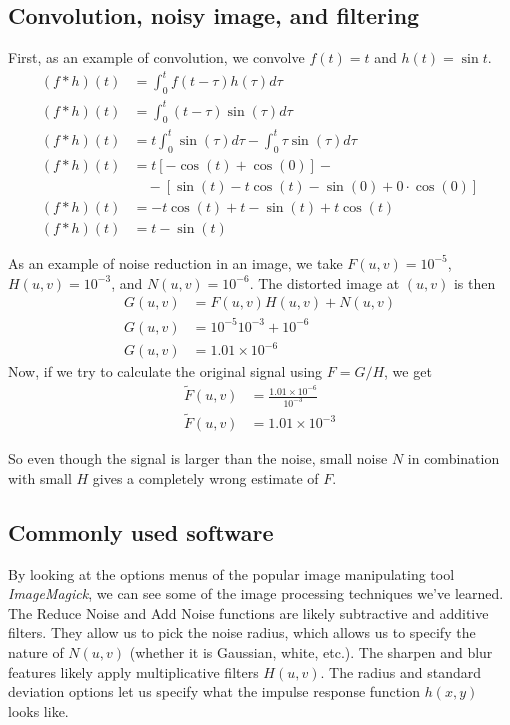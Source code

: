 \documentclass[twocolumn]{myarticle}
\begin{document}
\subsection{Convolution, noisy image, and filtering}
\label{subsec:convolution_noisy_image_and_filtering}

First, as an example of convolution, we convolve $ f(t) = t $ and $ h(t) = \sin t $.
\begin{align}
    (f * h)(t) &= \int_{0}^{t} f(t - \tau) h(\tau) d \tau
    \\
    (f * h)(t) &= \int_{0}^{t} (t - \tau) \sin(\tau) d \tau
    \\
    (f * h)(t) &= t \int_{0}^{t} \sin(\tau) d \tau - \int_{0}^{t} \tau \sin (\tau) d \tau
    \\
    (f * h)(t) &= t \left[ -\cos(t) + \cos(0) \right] - 
    \nonumber \\
    &\quad - \left[ \sin(t) - t \cos(t) - \sin(0) + 0 \cdot \cos(0) \right]
    \\
    (f * h)(t) &= - t \cos(t) + t - \sin(t) + t \cos(t)
    \\
    (f * h)(t) &= t - \sin(t)
\end{align}

As an example of noise reduction in an image, we take $ F(u,v) = 10^{-5} $, $ H(u,v) = 10^{-3} $, and $ N(u,v) = 10^{-6} $.
The distorted image at $ (u,v) $ is then
\begin{align}
    G(u,v) &= F(u,v) H(u,v) + N(u,v)
    \\
    G(u,v) &= 10^{-5} 10^{-3} + 10^{-6}
    \\
    G(u,v) &= 1.01 \times 10^{-6}
\end{align}
Now, if we try to calculate the original signal using $ F = G/H $, we get
\begin{align}
    \tilde{F}(u,v) &= \frac{1.01 \times 10^{-6}}{10^{-3}}
    \\
    \tilde{F}(u,v) &= 1.01 \times 10^{-3}
\end{align}

So even though the signal is larger than the noise, small noise $ N $ in combination with small $ H $ gives a completely wrong estimate of $ F $.

\subsection{Commonly used software}
\label{subsec:commonly_used_software}

By looking at the options menus of the popular image manipulating tool \emph{ImageMagick}, we can see some of the image processing techniques we've learned.
The Reduce Noise and Add Noise functions are likely subtractive and additive filters.
They allow us to pick the noise radius, which allows us to specify the nature of $ N(u,v) $ (whether it is Gaussian, white, etc.).
The sharpen and blur features likely apply multiplicative filters $ H(u,v) $.
The radius and standard deviation options let us specify what the impulse response function $ h(x,y) $ looks like.
\end{document}
